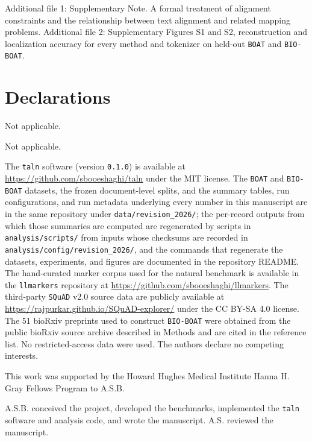 \documentclass[pdflatex,lineno,referee,sn-vancouver-num]{sn-jnl}
\theoremstyle{thmstyleone}
\theoremstyle{thmstylethree}
\theoremstyle{thmstyletwo}
\begin{document}
\backmatter

Additional file 1: Supplementary Note. A formal treatment of alignment constraints and the relationship between text alignment and related mapping problems. Additional file 2: Supplementary Figures S1 and S2, reconstruction and localization accuracy for every method and tokenizer on held-out \texttt{BOAT} and \texttt{BIO-BOAT}.

\section*{Declarations}

Not applicable.

Not applicable.

The \texttt{taln} software (version \texttt{0.1.0}) is available at \href{https://github.com/sbooeshaghi/taln}{https://github.com/sbooeshaghi/taln} under the MIT license. The \texttt{BOAT} and \texttt{BIO-BOAT} datasets, the frozen document-level splits, and the summary tables, run configurations, and run metadata underlying every number in this manuscript are in the same repository under \texttt{data/revision\_2026/}; the per-record outputs from which those summaries are computed are regenerated by scripts in \texttt{analysis/scripts/} from inputs whose checksums are recorded in \texttt{analysis/config/revision\_2026/}, and the commands that regenerate the datasets, experiments, and figures are documented in the repository README. The hand-curated marker corpus used for the natural benchmark is available in the \texttt{llmarkers} repository at \href{https://github.com/sbooeshaghi/llmarkers}{https://github.com/sbooeshaghi/llmarkers}. The third-party \texttt{SQuAD} v2.0 source data are publicly available at \href{https://rajpurkar.github.io/SQuAD-explorer/}{https://rajpurkar.github.io/SQuAD-explorer/} under the CC BY-SA 4.0 license. The 51 bioRxiv preprints used to construct \texttt{BIO-BOAT} were obtained from the public bioRxiv source archive described in Methods and are cited in the reference list. No restricted-access data were used.
The authors declare no competing interests.

This work was supported by the Howard Hughes Medical Institute Hanna H. Gray Fellows Program to A.S.B.

A.S.B. conceived the project, developed the benchmarks, implemented the \texttt{taln} software and analysis code, and wrote the manuscript. A.S. reviewed the manuscript.
\end{document}
